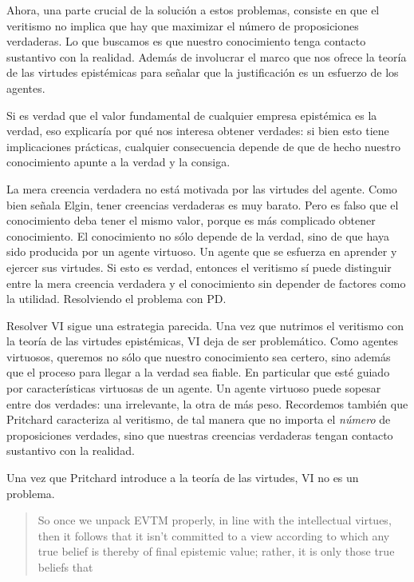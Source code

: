 {{{{Ahora, una parte crucial de la solución a estos problemas, consiste en que el veritismo no implica que hay que maximizar el número de proposiciones verdaderas.
Lo que buscamos es que nuestro conocimiento tenga contacto sustantivo con la realidad.
Además de involucrar el marco que nos ofrece la teoría de las virtudes epistémicas para señalar que la justificación es un esfuerzo de los agentes.

Si es verdad que el valor fundamental de cualquier empresa epistémica es la verdad, eso explicaría por qué nos interesa obtener verdades: si bien esto tiene implicaciones prácticas, cualquier consecuencia depende de que de hecho nuestro conocimiento apunte a la verdad y la consiga.

La mera creencia verdadera no está motivada por las virtudes del agente.
Como bien señala Elgin, tener creencias verdaderas es muy barato.
Pero es falso que el conocimiento deba tener el mismo valor, porque es más complicado obtener conocimiento.
El conocimiento no sólo depende de la verdad, sino de que haya sido producida por un agente virtuoso.
Un agente que se esfuerza en aprender y ejercer sus virtudes.
Si esto es verdad, entonces el veritismo sí puede distinguir entre la mera creencia verdadera y el conocimiento sin depender de factores como la utilidad.
Resolviendo el problema con PD.

Resolver VI sigue una estrategia parecida.
Una vez que nutrimos el veritismo con la teoría de las virtudes epistémicas, VI deja de ser problemático.
Como agentes virtuosos, queremos no sólo que nuestro conocimiento sea certero, sino además que el proceso para llegar a la verdad sea fiable.
En particular que esté guiado por características virtuosas de un agente.
Un agente virtuoso puede sopesar entre dos verdades: una irrelevante, la otra de más peso.
Recordemos también que Pritchard caracteriza al veritismo, de tal manera que no importa el \emph{número} de proposiciones verdades, sino que nuestras creencias verdaderas tengan contacto sustantivo con la realidad.

Una vez que Pritchard introduce a la teoría de las virtudes, VI no es un problema.

\begin{quote}
    So once we unpack EVTM properly, in line with the intellectual virtues, then it follows that it isn’t committed to a view according to which any true belief is thereby of final epistemic value; rather, it is only those true beliefs that %
\end{quote}

}}}}
